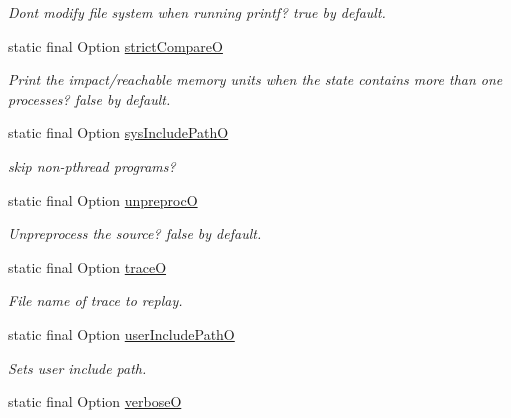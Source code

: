 \begin{DoxyCompactItemize}
\begin{DoxyCompactList}\small\item\em Don\textquotesingle{}t modify file system when running printf? true by default. \end{DoxyCompactList}\item 
static final Option \hyperlink{classedu_1_1udel_1_1cis_1_1vsl_1_1civl_1_1config_1_1IF_1_1CIVLConstants_add91532d6eb02876e1facf863c65b8a5}{strict\+Compare\+O}
\begin{DoxyCompactList}\small\item\em Print the impact/reachable memory units when the state contains more than one processes? false by default. \end{DoxyCompactList}\item 
static final Option \hyperlink{classedu_1_1udel_1_1cis_1_1vsl_1_1civl_1_1config_1_1IF_1_1CIVLConstants_ad8ba2755020a91dedb4a4f5bb1c8cab8}{sys\+Include\+Path\+O}
\begin{DoxyCompactList}\small\item\em skip non-\/pthread programs? \end{DoxyCompactList}\item 
static final Option \hyperlink{classedu_1_1udel_1_1cis_1_1vsl_1_1civl_1_1config_1_1IF_1_1CIVLConstants_a6da1d3d2111e64af4a8640cfa70249f0}{unpreproc\+O}
\begin{DoxyCompactList}\small\item\em Unpreprocess the source? false by default. \end{DoxyCompactList}\item 
static final Option \hyperlink{classedu_1_1udel_1_1cis_1_1vsl_1_1civl_1_1config_1_1IF_1_1CIVLConstants_a03ec5d26fac6775d6011970883cbc4f2}{trace\+O}
\begin{DoxyCompactList}\small\item\em File name of trace to replay. \end{DoxyCompactList}\item 
static final Option \hyperlink{classedu_1_1udel_1_1cis_1_1vsl_1_1civl_1_1config_1_1IF_1_1CIVLConstants_aeac57e9e85d9dd0b66651b1060dd9175}{user\+Include\+Path\+O}
\begin{DoxyCompactList}\small\item\em Sets user include path. \end{DoxyCompactList}\item 
static final Option \hyperlink{classedu_1_1udel_1_1cis_1_1vsl_1_1civl_1_1config_1_1IF_1_1CIVLConstants_a4ddd080c8bf9bf33ef356eaa13390a9e}{verbose\+O}

\end{DoxyCompactItemize}

